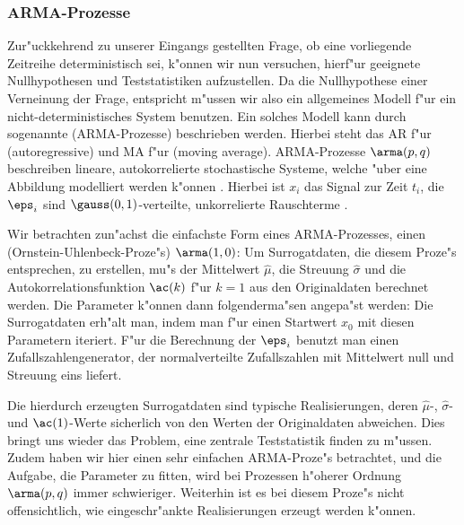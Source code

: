 \subsubsection{ARMA-Prozesse}
\label{chaparma}
Zur"uckkehrend zu unserer Eingangs gestellten Frage, ob eine vorliegende Zeitreihe deterministisch 
sei, k"onnen wir nun versuchen, hierf"ur geeignete Nullhypothesen und Teststatistiken
aufzustellen. Da die Nullhypothese einer Verneinung der Frage, entspricht m"ussen wir also 
ein allgemeines Modell f"ur ein nicht-deterministisches System benutzen. Ein solches
Modell kann durch sogenannte \begriff(ARMA-Prozesse) beschrieben werden. Hierbei steht
das AR f"ur \begriff(autoregressive) und MA f"ur \begriff(moving average). ARMA-Prozesse $\arma(p,q)$
beschreiben lineare, autokorrelierte stochastische Systeme, welche "uber eine Abbildung 
modelliert werden k"onnen \cite{Theiler92b}. Hierbei ist $x_i$ das Signal zur Zeit $t_i$,
die $\eps_i$ sind $\gauss(0,1)$-verteilte, unkorrelierte Rauschterme .

Wir betrachten zun"achst die einfachste Form eines ARMA-Prozesses, einen
\begriff(Ornstein-Uhlenbeck-Proze"s) $\arma(1,0)$:
Um Surrogatdaten, die diesem Proze"s entsprechen, zu erstellen, mu"s der Mittelwert
$\hat\mu$, die Streuung $\hat\sigma$ und die Autokorrelationsfunktion $\ac(k)$
f"ur $k=1$ aus den Originaldaten berechnet werden. Die Parameter k"onnen dann
folgenderma"sen angepa"st werden:
Die Surrogatdaten erh"alt man, indem man  f"ur einen Startwert $x_0$ mit
diesen Parametern iteriert. F"ur die Berechnung der $\eps_i$ benutzt man einen
Zufallszahlengenerator, der normalverteilte Zufallszahlen mit Mittelwert null und Streuung eins
liefert.  

Die hierdurch erzeugten Surrogatdaten sind typische Realisierungen, deren
$\hat\mu$-, $\hat\sigma$- und $\ac(1)$-Werte sicherlich von den Werten der
Originaldaten abweichen.  Dies bringt uns wieder das Problem, eine zentrale
Teststatistik finden zu m"ussen.  Zudem haben wir hier einen sehr einfachen ARMA-Proze"s
betrachtet, und die Aufgabe, die Parameter zu fitten, wird bei Prozessen h"oherer Ordnung
$\arma(p,q)$ immer schwieriger.  Weiterhin ist es bei diesem Proze"s nicht offensichtlich,
wie eingeschr"ankte Realisierungen erzeugt werden k"onnen.


